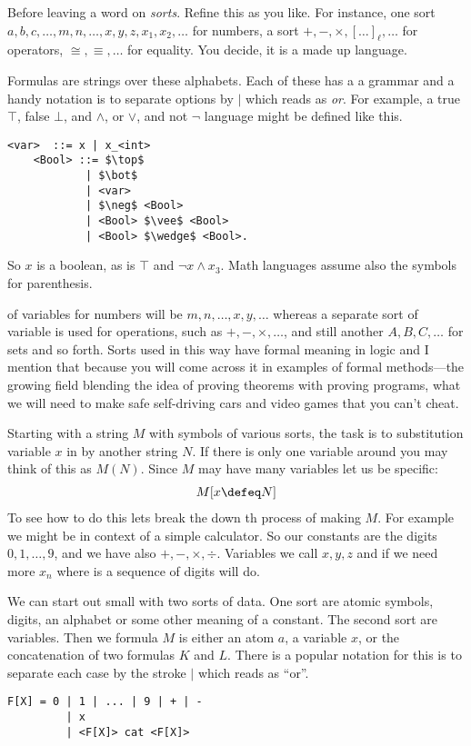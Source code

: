 Before leaving a word on \emph{sorts}.
Refine this as you like. For instance, one sort $a,b,c,\ldots,m,n,\dots, x,y,z,
x_1,x_2,\ldots$ for numbers, a sort $+,-,\times, [\ldots]_{\ell},\ldots$ for
operators, $\cong, \equiv, \ldots$ for equality.  You decide, it is a made up 
language.



  Formulas are strings over these alphabets.  Each of these has a 
a grammar and a handy notation is 
to separate options by $\mid$ which reads as \emph{or}.  For example, 
a true $\top$, false $\bot$, and $\wedge$, or $\vee$, and not $\neg$ language might be defined like this.
\newpage    
\begin{lstfloat}
\begin{lstlisting}[mathescape]
    <var>  ::= x | x_<int>
    <Bool> ::= $\top$ 
            | $\bot$ 
            | <var>
            | $\neg$ <Bool> 
            | <Bool> $\vee$ <Bool> 
            | <Bool> $\wedge$ <Bool>.
\end{lstlisting}
\end{lstfloat}

So $x$ is a boolean, as is $\top$ and $\neg x\wedge x_3$.  Math languages assume 
also the symbols for parenthesis.

of variables for numbers will be $m,n,\ldots,
x,y,\ldots$ whereas a separate sort of variable is used for operations, such as
$+,-,\times,\ldots$, and still another $A,B,C,\ldots$ for sets and so forth.
Sorts used in this way have formal meaning in logic and I mention that because 
you will come across it in examples of formal methods---the growing field 
blending the idea of proving theorems with proving programs, what we will 
need to make safe self-driving cars and video games that you can't cheat.

Starting with a string $M$ with symbols of various sorts, the task is to 
substitution variable $x$ in by another string $N$.  If there is only one 
variable around you may think of this as $M(N)$.   Since $M$ may have many 
variables let us be specific:
\begin{align*}
    M[x\defeq N]
\end{align*}
To see how to do this lets break the down th process of making $M$.
For example we might be in context of a simple calculator.  So our constants 
are the digits $0,1,\ldots,9$, and we have also $+,-,\times,\div$.
Variables we call $x,y,z$ and if we need more $x_n$ where is a sequence 
of digits will do.


We can start out small with two sorts of data.  One 
sort are atomic symbols, digits, an alphabet or some other meaning 
of a constant.  The second sort are variables.  Then we formula 
$M$ is either an atom $a$, a variable $x$, or the concatenation 
of two formulas $K$ and $L$.  There is a popular notation for this 
is to separate each case by the stroke $\mid$ which reads as ``or''.
\begin{lstlisting}[language=Hidris,mathescape]
    F[X] = 0 | 1 | ... | 9 | + | -
         | x
         | <F[X]> cat <F[X]>
\end{lstlisting}

